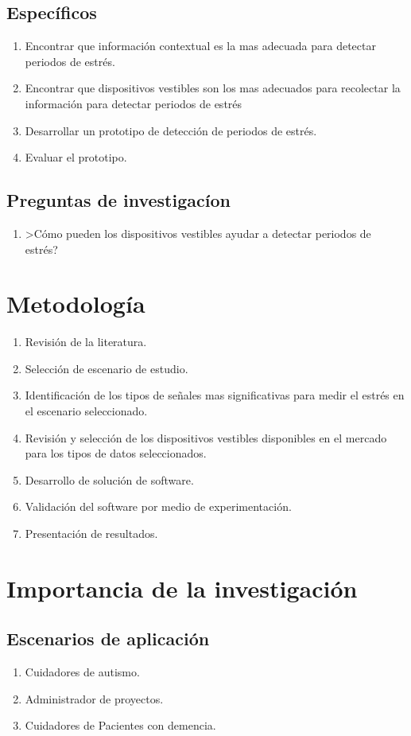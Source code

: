 \documentclass[letterpaper,12pt]{cicese}
\begin{document}
			\section{Espec\'ificos}
				\begin{enumerate}
					\item Encontrar que informaci\'on contextual es la mas adecuada para detectar periodos de estr\'es.
					\item Encontrar que dispositivos vestibles son los mas adecuados para recolectar la informaci\'on para detectar periodos de estr\'es
					\item Desarrollar un prototipo de detecci\'on de periodos de estr\'es.
					\item Evaluar el prototipo.
				\end{enumerate}
			\section{Preguntas de investigac\'ion}
				\begin{enumerate}
					\item >C\'omo pueden los dispositivos vestibles ayudar a detectar periodos de estr\'es?
				\end{enumerate}
		\chapter{Metodolog\'ia}
				\begin{enumerate}
					\item Revisi\'on de la literatura.
					\item Selecci\'on de escenario de estudio.
					\item Identificaci\'on de los tipos de se\~nales mas significativas para medir el estr\'es en el escenario seleccionado.
					\item Revisi\'on y selecci\'on de los dispositivos vestibles disponibles en el mercado para los tipos de datos seleccionados.
					\item Desarrollo de soluci\'on de software.
					\item Validaci\'on del software por medio de experimentaci\'on.
					\item Presentaci\'on de resultados.
				\end{enumerate}
		\chapter{Importancia de la investigaci\'on}
			\section{Escenarios de aplicaci\'on}
				\begin{enumerate}
					\item Cuidadores de autismo.
					\item Administrador de proyectos.
					\item Cuidadores de Pacientes con demencia.
				\end{enumerate}
\end{document}
